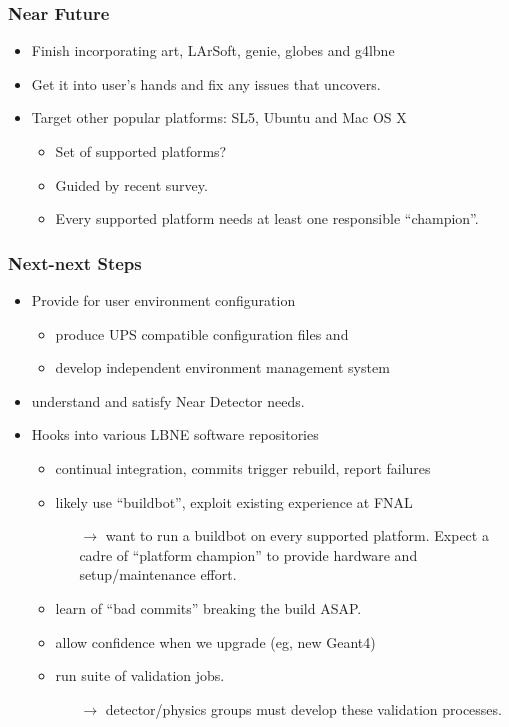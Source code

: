 \documentclass[xcolor=dvipsnames]{beamer}
\begin{document}
\begin{frame}
  \frametitle{Near Future}
  \begin{itemize}
  \item Finish incorporating art, LArSoft, genie, globes and g4lbne
  \item Get it into user's hands and fix any issues that uncovers.
  \item Target other popular platforms: SL5, Ubuntu and Mac OS X
    \begin{itemize}
    \item Set of supported platforms?
    \item Guided by recent survey.
    \item Every supported platform needs at least one responsible ``champion''.
    \end{itemize}
  \end{itemize}
\end{frame}

\begin{frame}
  \frametitle{Next-next Steps}
  \begin{itemize}
  \item Provide for user environment configuration
    \begin{itemize}
    \item produce UPS compatible configuration files and 
    \item develop independent environment management system
    \end{itemize}
  \item understand and satisfy Near Detector needs.
  \item Hooks into various LBNE software repositories
    \begin{itemize}
    \item continual integration, commits trigger rebuild,
      report failures
    \item likely use ``buildbot'', exploit existing experience at FNAL 
      \begin{itemize}
      \item [$\rightarrow$] want to run a buildbot on every supported platform.  Expect a cadre of ``platform champion'' to provide hardware and setup/maintenance effort.
      \end{itemize}
    \item learn of ``bad commits'' breaking the build ASAP.
    \item allow confidence when we upgrade (eg, new Geant4)
    \item run suite of validation jobs.
      \begin{itemize}
      \item[$\rightarrow$] detector/physics groups must develop these validation processes.
      \end{itemize}
    \end{itemize}
  \end{itemize}
\end{frame}
\end{document}

